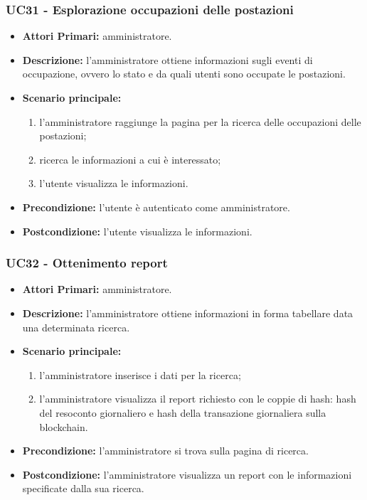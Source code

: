 \subsubsection{ UC31 - Esplorazione occupazioni delle postazioni}
\begin{itemize}
	\item\textbf{Attori Primari:} 
	amministratore.
	\item\textbf{Descrizione:} 
	l'amministratore ottiene informazioni sugli eventi di occupazione, ovvero lo stato e da quali utenti sono occupate le postazioni.
	\item\textbf{Scenario principale:} 
	\begin{enumerate}
		\item l'amministratore raggiunge la pagina per la ricerca delle occupazioni delle postazioni;
		\item ricerca le informazioni a cui è interessato;
		\item l'utente visualizza le informazioni.
	\end{enumerate}	
	\item\textbf{Precondizione:} 
	l'utente è autenticato come amministratore.
	\item\textbf{Postcondizione:}
	l'utente visualizza le informazioni.
\end{itemize}

\subsubsection{ UC32 - Ottenimento report}
\begin{itemize}
	\item\textbf{Attori Primari:} 
	amministratore.
	\item\textbf{Descrizione:} 
	l'amministratore ottiene informazioni in forma tabellare data una determinata ricerca.
	\item\textbf{Scenario principale:} 
	\begin{enumerate}
		\item l'amministratore inserisce i dati per la ricerca;
		\item l'amministratore visualizza il report richiesto con le coppie di hash: hash del resoconto giornaliero e hash della transazione giornaliera sulla blockchain.
	\end{enumerate}
	\item\textbf{Precondizione:} 
	l'amministratore si trova sulla pagina di ricerca.
	\item\textbf{Postcondizione:}
	l'amministratore visualizza un report con le informazioni specificate dalla sua ricerca.
\end{itemize}

